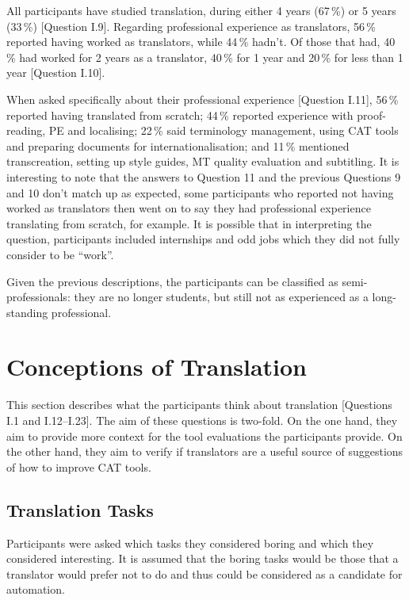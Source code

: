 All participants have studied translation, during either 4 years (67\,\%) or 5 years (33\,\%) [Question I.9]. Regarding professional experience as translators, 56\,\% reported having worked as translators, while 44\,\% hadn't. Of those that had, 40\,\% had worked for 2 years as a translator, 40\,\% for 1 year and 20\,\% for less than 1 year [Question I.10].

When asked specifically about their professional experience [Question I.11], 56\,\% reported having translated from scratch; 44\,\% reported experience with proof-reading, \ac{PE} and localising; 22\,\% said terminology management, using \ac{CAT} tools and preparing documents for internationalisation; and 11\,\% mentioned transcreation, setting up style guides, \ac{MT} quality evaluation and subtitling. It is interesting to note that the answers to Question 11 and the previous Questions 9 and 10 don't match up as expected, \ie some participants who reported not having worked as translators then went on to say they had professional experience translating from scratch, for example. It is possible that in interpreting the question, participants included internships and odd jobs which they did not fully consider to be ``work''.

Given the previous descriptions, the participants can be classified as semi-professionals: they are no longer students, but still not as experienced as a long-standing professional.



\section{Conceptions of Translation}

\noindent This section describes what the participants think about translation [Questions I.1 and I.12--I.23]. The aim of these questions is two-fold. On the one hand, they aim to provide more context for the tool evaluations the participants provide. On the other hand, they aim to verify if translators are a useful source of suggestions of how to improve \ac{CAT} tools.

\subsection{Translation Tasks}

\noindent Participants were asked which tasks they considered boring and which they considered interesting. It is assumed that the boring tasks would be those that a translator would prefer not to do and thus could be considered as a candidate for automation. 

